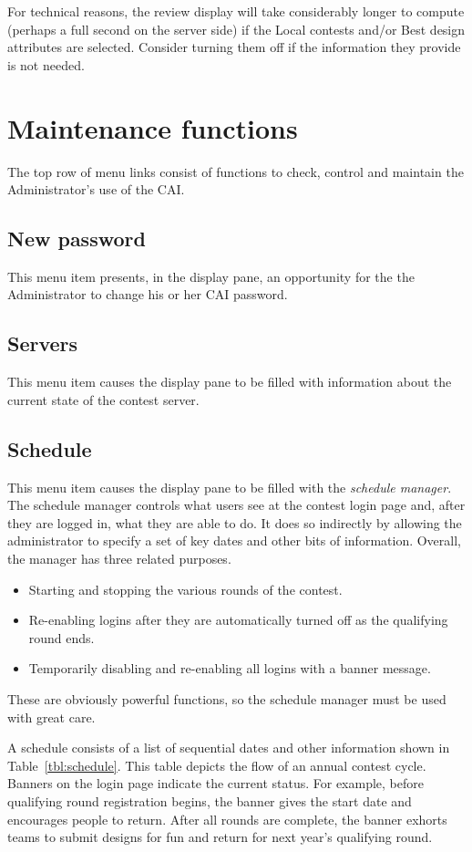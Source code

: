 \documentclass[11pt,letterpaper]{refart}
\def\ui#1{\textsf{#1}}
\begin{document}
For technical reasons, the review display will take considerably longer to compute
(perhaps a full second on the server side) if the \ui{Local contests}  and/or 
\ui{Best design} attributes are selected.  Consider turning them off if the
information they provide is not needed.

\section{Maintenance functions}
The top row of menu links consist of functions to check, control and maintain the 
Administrator's use of the CAI.

\subsection{New password}
This menu item presents, in the display pane, an opportunity for the
the Administrator to change his or her CAI password.

\subsection{Servers}
This menu item causes the display pane to be filled with information about the
current state of the contest server. 

\subsection{Schedule}
This menu item causes the display pane to be filled with the \emph{schedule
manager}. The schedule manager controls what users see at the contest
login page and, after they are logged in, what they are able to do.  
It does so indirectly by allowing the administrator to specify a set of key 
dates and other bits of information.
Overall, the manager has three related purposes.
\begin{itemize}
\item Starting and stopping the various rounds of the contest.
\item Re-enabling logins after they are automatically turned off
as the qualifying round ends.
\item Temporarily disabling and re-enabling all logins with a banner 
message.
\end{itemize}
These are obviously powerful functions, so the schedule manager must
be used with great care.

A schedule consists of a list of sequential dates and other information
shown in Table~\ref{tbl:schedule}.  This table depicts the flow of an
annual contest cycle.  Banners on the login page indicate the current
status.  For example, before qualifying round registration begins, the
banner gives the start date and encourages people to return.  After
all rounds are complete, the banner exhorts teams to submit designs
for fun and return for next year's qualifying round.
\end{document}
